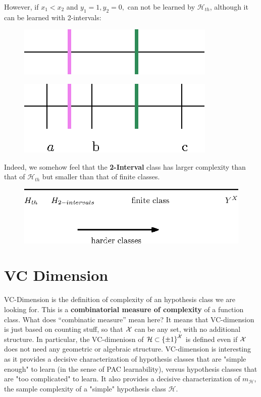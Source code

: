 \documentclass[11pt]{article}
\newcommand{\Hc}{\mathcal{H}}
\begin{document}
However, if $x_1 < x_2$ and $y_1=1, y_2=0, $ can not be learned by $\Hc_{th}$, although it can be learned with 2-intervals:
\begin{figure}[h!]
\centering
\includegraphics[scale=0.6]{VC_threshold_intuitive2.eps}
\end{figure}

\vspace{5mm}

\begin{figure}[h!]
\centering
\includegraphics[scale=0.6]{VC_threshold_intuitive4.eps}
\end{figure}

Indeed, we somehow feel that the \textbf{2-Interval} class has larger complexity than that of $\Hc_{th}$ but smaller than that of finite classes.

\begin{figure}[h!]
\centering
\includegraphics[scale=0.8]{complexity_measure2.eps}
\end{figure}

\section{VC Dimension}

VC-Dimension is the definition of complexity of an hypothesis class we are
looking for. This is a {\bf combinatorial measure of complexity} of a function
class. What does ``combinatic measure'' mean here? It means that VC-dimension is just based on counting stuff, so that $\mathcal{X}$ can be any
set, with no additional structure. In particular, the VC-dimeniosn of
$\Hc\subset \left\{ \pm 1 \right\}^\X$ is defined even if $\mathcal{X}$ does not need any
geometric or algebraic structure. VC-dimension is interesting as it provides a
decisive characterization of hypothesis classes that are "simple enough" to
learn (in the sense of PAC learnability), versus hypothesis classes that are "too complicated" to learn. It also provides a decisive characterization of $m_\Hc$, the sample complexity of a "simple" hypothesis class $\Hc$.  
\end{document}
